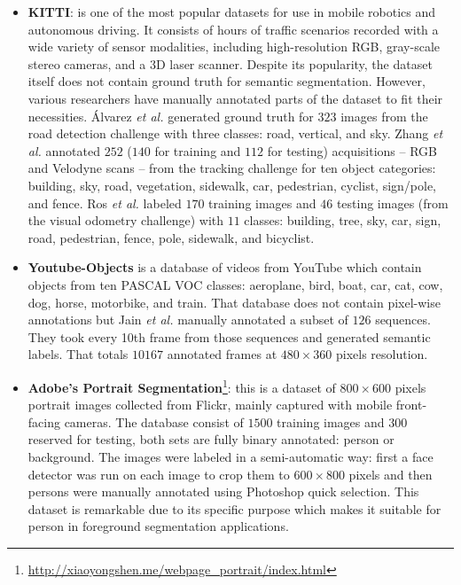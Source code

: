 \begin{itemize}
	\item \textbf{KITTI}\cite{Geiger2013}: is one of the most popular datasets for use in mobile robotics and autonomous driving. It consists of hours of traffic scenarios recorded with a wide variety of sensor modalities, including high-resolution RGB, gray-scale stereo cameras, and a 3D laser scanner. Despite its popularity, the dataset itself does not contain ground truth for semantic segmentation. However, various researchers have manually annotated parts of the dataset to fit their necessities. Álvarez \emph{et al.}\cite{Alvarez2012}\cite{Ros2015a} generated ground truth for $323$ images from the road detection challenge with three classes: road, vertical, and sky. Zhang \emph{et al.}\cite{Zhang2015} annotated $252$ ($140$ for training and $112$ for testing) acquisitions -- RGB and Velodyne scans -- from the tracking challenge for ten object categories: building, sky, road, vegetation, sidewalk, car, pedestrian, cyclist, sign/pole, and fence. Ros \emph{et al.} \cite{Ros2015} labeled $170$ training images and $46$ testing images (from the visual odometry challenge) with $11$ classes: building, tree, sky, car, sign, road, pedestrian, fence, pole, sidewalk, and bicyclist.
	\item \textbf{Youtube-Objects}\cite{Prest2012} is a database of videos from YouTube which contain objects from ten PASCAL \acs{VOC} classes: aeroplane, bird, boat, car, cat, cow, dog, horse, motorbike, and train. That database  does not contain pixel-wise annotations but Jain \emph{et al.}\cite{Jain2014} manually annotated a subset of $126$ sequences. They took every 10th frame from those sequences and generated semantic labels. That totals  $10167$ annotated frames at $480\times360$ pixels resolution.
	\item \textbf{Adobe's Portrait Segmentation}\cite{Shen2016}\footnote{\url{http://xiaoyongshen.me/webpage_portrait/index.html}}: this is a dataset of $800\times600$ pixels portrait images collected from Flickr, mainly captured with mobile front-facing cameras. The database consist of $1500$ training images and $300$ reserved for testing, both sets are fully binary annotated: person or background. The images were labeled in a semi-automatic way: first a face detector was run on each image to crop them to $600\times800$ pixels and then persons were manually annotated using Photoshop quick selection. This dataset is remarkable due to its specific purpose which makes it suitable for person in foreground segmentation applications.

\end{itemize}
